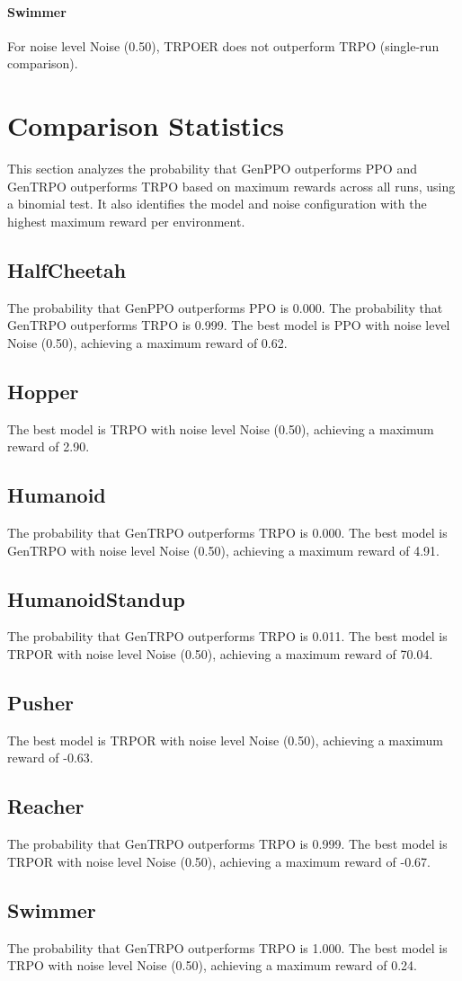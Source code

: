 \paragraph{Swimmer}
For noise level Noise (0.50), TRPOER does not outperform TRPO (single-run comparison).
\section{Comparison Statistics}
This section analyzes the probability that GenPPO outperforms PPO and GenTRPO outperforms TRPO based on maximum rewards across all runs, using a binomial test. It also identifies the model and noise configuration with the highest maximum reward per environment.
\subsection{HalfCheetah}
The probability that GenPPO outperforms PPO is 0.000.
The probability that GenTRPO outperforms TRPO is 0.999.
The best model is PPO with noise level Noise (0.50), achieving a maximum reward of 0.62.
\subsection{Hopper}
The best model is TRPO with noise level Noise (0.50), achieving a maximum reward of 2.90.
\subsection{Humanoid}
The probability that GenTRPO outperforms TRPO is 0.000.
The best model is GenTRPO with noise level Noise (0.50), achieving a maximum reward of 4.91.
\subsection{HumanoidStandup}
The probability that GenTRPO outperforms TRPO is 0.011.
The best model is TRPOR with noise level Noise (0.50), achieving a maximum reward of 70.04.
\subsection{Pusher}
The best model is TRPOR with noise level Noise (0.50), achieving a maximum reward of -0.63.
\subsection{Reacher}
The probability that GenTRPO outperforms TRPO is 0.999.
The best model is TRPOR with noise level Noise (0.50), achieving a maximum reward of -0.67.
\subsection{Swimmer}
The probability that GenTRPO outperforms TRPO is 1.000.
The best model is TRPO with noise level Noise (0.50), achieving a maximum reward of 0.24.
